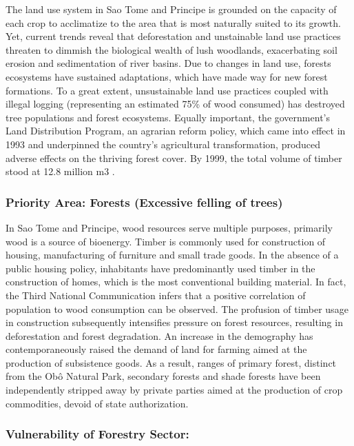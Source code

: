 \documentclass[
]{book}
\begin{document}
The land use system in Sao Tome and Principe is grounded on the capacity of each crop to acclimatize to the area that is most naturally suited to its growth. Yet, current trends reveal that deforestation and unstainable land use practices threaten to dimmish the biological wealth of lush woodlands, exacerbating soil erosion and sedimentation of river basins. Due to changes in land use, forests ecosystems have sustained adaptations, which have made way for new forest formations. To a great extent, unsustainable land use practices coupled with illegal logging (representing an estimated 75\% of wood consumed) has destroyed tree populations and forest ecosystems. Equally important, the government's Land Distribution Program, an agrarian reform policy, which came into effect in 1993 and underpinned the country's agricultural transformation, produced adverse effects on the thriving forest cover. By 1999, the total volume of timber stood at 12.8 million m3 .

\hypertarget{priority-area-forests-excessive-felling-of-trees-1}{%
\subsubsection{Priority Area: Forests (Excessive felling of trees)}\label{priority-area-forests-excessive-felling-of-trees-1}}

In Sao Tome and Principe, wood resources serve multiple purposes, primarily wood is a source of bioenergy. Timber is commonly used for construction of housing, manufacturing of furniture and small trade goods. In the absence of a public housing policy, inhabitants have predominantly used timber in the construction of homes, which is the most conventional building material. In fact, the Third National Communication infers that a positive correlation of population to wood consumption can be observed. The profusion of timber usage in construction subsequently intensifies pressure on forest resources, resulting in deforestation and forest degradation. An increase in the demography has contemporaneously raised the demand of land for farming aimed at the production of subsistence goods. As a result, ranges of primary forest, distinct from the Obô Natural Park, secondary forests and shade forests have been independently stripped away by private parties aimed at the production of crop commodities, devoid of state authorization.

\hypertarget{vulnerability-of-forestry-sector-1}{%
\subsubsection{Vulnerability of Forestry Sector:}\label{vulnerability-of-forestry-sector-1}}
\end{document}
